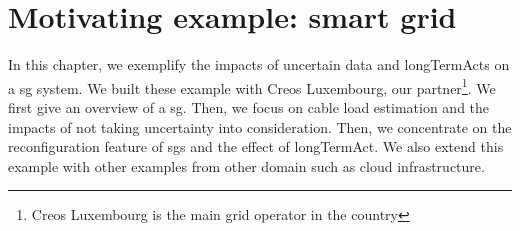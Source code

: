 \chapter{Motivating example: smart grid}
\label{chapt:example}


%


In this chapter, we exemplify the impacts of uncertain data and \glspl{longTermAct} on a \gls{sg} system.
We built these example with Creos Luxembourg, our partner\footnote{Creos Luxembourg is the main grid operator in the country}.
We first give an overview of a \gls{sg}.
Then, we focus on cable load estimation and the impacts of not taking uncertainty into consideration. 
Then, we concentrate on the reconfiguration feature of \glspl{sg} and the effect of \gls{longTermAct}.
We also extend this example with other examples from other domain such as cloud infrastructure.





